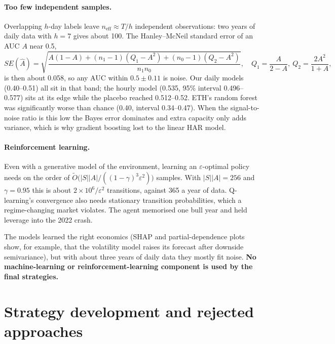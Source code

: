 \documentclass[11pt,a4paper]{article}
\theoremstyle{definition}
\begin{document}
\paragraph{Too few independent samples.} Overlapping $h$-day labels leave $n_{\text{eff}}\approx T/h$ independent observations: two years of daily data with $h=7$ gives about 100. The Hanley--McNeil standard error of an AUC $A$ near 0.5,
\begin{equation}
SE(\hat A)=\sqrt{\frac{A(1-A)+(n_1-1)(Q_1-A^2)+(n_0-1)(Q_2-A^2)}{n_1n_0}},\quad Q_1=\frac{A}{2-A},\ Q_2=\frac{2A^2}{1+A},
\end{equation}
is then about 0.058, so any AUC within $0.5\pm0.11$ is noise. Our daily models (0.40--0.51) all sit in that band; the hourly model (0.535, 95\% interval 0.496--0.577) sits at its edge while the placebo reached 0.512--0.52. ETH's random forest was significantly worse than chance (0.40, interval 0.34--0.47). When the signal-to-noise ratio is this low the Bayes error dominates and extra capacity only adds variance, which is why gradient boosting lost to the linear HAR model.

\paragraph{Reinforcement learning.} Even with a generative model of the environment, learning an $\varepsilon$-optimal policy needs on the order of $\tilde O\bigl(|S||A|/((1-\gamma)^3\varepsilon^2)\bigr)$ samples. With $|S||A|=256$ and $\gamma=0.95$ this is about $2\times10^6/\varepsilon^2$ transitions, against 365 a year of data. Q-learning's convergence also needs stationary transition probabilities, which a regime-changing market violates. The agent memorised one bull year and held leverage into the 2022 crash.

The models learned the right economics (SHAP and partial-dependence plots show, for example, that the volatility model raises its forecast after downside semivariance), but with about three years of daily data they mostly fit noise. \textbf{No machine-learning or reinforcement-learning component is used by the final strategies.}

\section{Strategy development and rejected approaches}\label{sec:dev}
\end{document}
